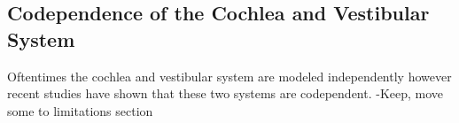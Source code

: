 \documentclass[12pt]{article}
\begin{document}




\subsection{Codependence of the Cochlea and Vestibular System}
Oftentimes the cochlea and vestibular system are modeled independently however recent studies have shown that these two systems are codependent. 
-Keep, move some to limitations section
\end{document}
